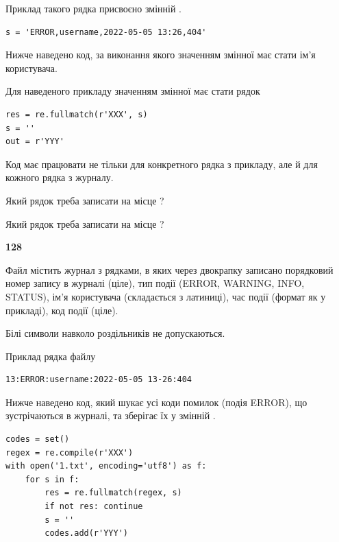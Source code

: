Приклад такого рядка присвоєно змінній .



\begin{verbatim}
s = 'ERROR,username,2022-05-05 13:26,404'
\end{verbatim}


Нижче наведено код, за виконання якого значенням змінної  має стати ім'я користувача.

Для наведеного прикладу значенням змінної  має стати рядок 



\begin{verbatim}
res = re.fullmatch(r'XXX', s)
s = ''
out = r'YYY'
\end{verbatim}


Код має працювати не тільки для конкретного рядка з прикладу, але й для кожного рядка з журналу.




Який рядок треба записати на місце  ?\par
\vspace{5mm}


Який рядок треба записати на місце  ?\par


\newpage

{\begin {center}\textbf{ 128}\end {center}}\par
Файл  містить журнал з рядками, в яких через двокрапку записано поряд\-ко\-вий номер запису в журналі (ціле), тип події (ERROR, WARNING, INFO, STATUS), ім'я користувача (складається з латиниці), час події (фор\-мат як у прикладі), код події (ціле).

Білі символи навколо роздільників не допускаються.

Приклад рядка файлу



\begin{verbatim}
13:ERROR:username:2022-05-05 13-26:404
\end{verbatim}


Нижче наведено код, який шукає усі коди помилок (подія ERROR), що зустріча\-ють\-ся в журналі, та зберігає їх у змінній .



\begin{verbatim}
codes = set()
regex = re.compile(r'XXX')
with open('1.txt', encoding='utf8') as f:
    for s in f:
        res = re.fullmatch(regex, s)
        if not res: continue
        s = ''
        codes.add(r'YYY')
\end{verbatim}





